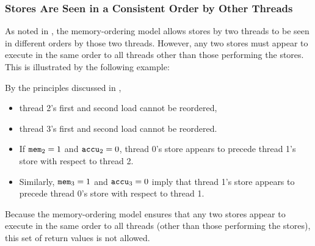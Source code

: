 \newpage

\subsubsection*{Stores Are Seen in a Consistent Order by Other Threads}

As noted in \cite[Section 8.2.3.5]{ref:Intel}, the memory-ordering model allows stores by two threads to be seen in different orders by those two threads.
However, any two stores must appear to execute in the same order to all threads other than those performing the stores.
This is illustrated by the following example:

\begin{table}[!hbt]
\noindent{}
\caption[Stores Are Seen in a Consistent Order by Other Threads]{Stores Are Seen in a Consistent Order by Other Threads \cite[Example 8-7]{ref:Intel}}
\label{tbl:litmus:intel:7}
\end{table}

\noindent
By the principles discussed in \cite[Section 8.2.3.2]{ref:Intel},
\begin{itemize}
  \item thread 2’s first and second load cannot be reordered,
  \item thread 3’s first and second load cannot be reordered.
  \item If $\texttt{mem}_2 = 1$ and $\texttt{accu}_2 = 0$, thread 0’s store appears to precede thread 1’s store with respect to thread 2.
  \item Similarly, $\texttt{mem}_3 = 1$ and $\texttt{accu}_3 = 0$ imply that thread 1’s store appears to precede thread 0’s store with respect to thread 1.
\end{itemize}
Because the memory-ordering model ensures that any two stores appear to execute in the same order to all threads (other than those performing the stores), this set of return values is not allowed.

